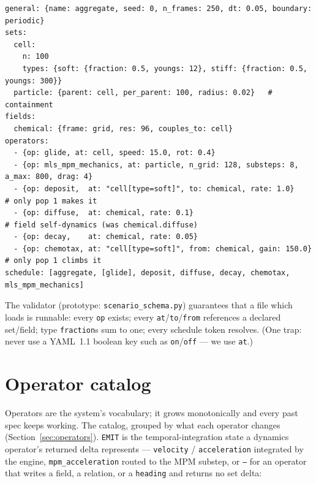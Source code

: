 \documentclass[11pt]{article}
\newcommand{\code}[1]{\texttt{#1}}
\begin{document}
\begin{lstlisting}[style=yaml,caption={A complete simulation: soft cells secrete and follow a chemical and self-aggregate.},label=lst:agg]
general: {name: aggregate, seed: 0, n_frames: 250, dt: 0.05, boundary: periodic}
sets:
  cell:
    n: 100
    types: {soft: {fraction: 0.5, youngs: 12}, stiff: {fraction: 0.5, youngs: 300}}
  particle: {parent: cell, per_parent: 100, radius: 0.02}   # containment
fields:
  chemical: {frame: grid, res: 96, couples_to: cell}
operators:
  - {op: glide, at: cell, speed: 15.0, rot: 0.4}
  - {op: mls_mpm_mechanics, at: particle, n_grid: 128, substeps: 8, a_max: 800, drag: 4}
  - {op: deposit,  at: "cell[type=soft]", to: chemical, rate: 1.0}    # only pop 1 makes it
  - {op: diffuse,  at: chemical, rate: 0.1}                           # field self-dynamics (was chemical.diffuse)
  - {op: decay,    at: chemical, rate: 0.05}
  - {op: chemotax, at: "cell[type=soft]", from: chemical, gain: 150.0} # only pop 1 climbs it
schedule: [aggregate, [glide], deposit, diffuse, decay, chemotax, mls_mpm_mechanics]
\end{lstlisting}

The validator (prototype: \code{scenario\_schema.py}) guarantees that a file which
loads is runnable: every \code{op} exists; every \code{at}/\code{to}/\code{from}
references a declared set/field; type \code{fraction}s sum to one; every schedule
token resolves. (One trap: never use a YAML~1.1 boolean key such as
\code{on}/\code{off} --- we use \code{at}.)

\section{Operator catalog}

Operators are the system's vocabulary; it grows monotonically and every past spec
keeps working. The catalog, grouped by what each operator changes (Section~\ref{sec:operators}).
\code{EMIT} is the temporal-integration state a dynamics operator's returned delta
represents --- \code{velocity} / \code{acceleration} integrated by the engine,
\code{mpm\_acceleration} routed to the MPM substep, or \code{---} for an operator that
writes a field, a relation, or a \code{heading} and returns no set delta:
\end{document}
